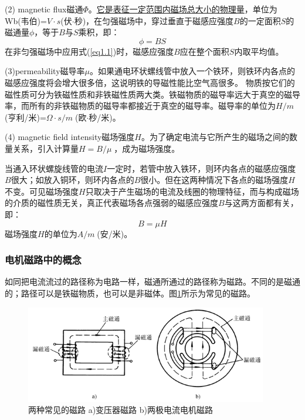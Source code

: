 \documentclass{book}
\begin{document}
(2) magnetic flux磁通$\Phi $。\uline{它是表征一定范围内磁场总大小的物理量}，单位为Wb(韦伯)=$V\cdot s$(伏$\cdot $秒)，在匀强磁场中，穿过垂直于磁感应强度$B$的一定面积$S$的磁通量$\phi $，等于$B$与$S$乘积，即：
\begin{equation}
\phi =BS
\label{eq1.1}
\end{equation}	
在非匀强磁场中应用式(\ref{eq1.1})时，磁感应强度$B$应在整个面积$S$内取平均值。

(3)permeability磁导率$\mu $。如果通电环状螺线管中放入一个铁环，则铁环内各点的磁感应强度将会增大很多倍，这说明铁的导磁性能比空气高很多。
物质按它们的磁性质可分为铁磁性质和非铁磁性质两大类。铁磁物质的磁导率远大于真空的磁导率，而所有的非铁磁物质的磁导率都接近于真空的磁导率。磁导率的单位为${H}/{m}\;$(亨利/米)=$\Omega \cdot {s}/{m}\;$(欧$\cdot $秒/米)。

(4) magnetic field intensity磁场强度$H$。为了确定电流与它所产生的磁场之间的数量关系，引入计算量$H={B}/{\mu }\;$，成为磁场强度。

当通入环状螺旋线管的电流$I$一定时，若管中放入铁环，则环内各点的磁感应强度$B$很大；如放入铜环，则环内各点的$B$很小。但在这两种情况下各点的磁场强度$H$不变。可见磁场强度$H$只取决于产生磁场的电流及线圈的物理特征，而与构成磁场的介质的磁性质无关，真正代表磁场各点强弱的磁感应强度$B$与这两方面都有关，即：
\begin{equation}
B=\mu H
\label{eq1.2}
\end{equation}
磁场强度$H$的单位为${A}/{m}\;$(安/米)。
\subsubsection{电机磁路中的概念}
如同把电流流过的路径称为电路一样，磁通所通过的路径称为磁路。不同的是磁通的；路径可以是铁磁物质，也可以是非磁体。图\ref{fig:changjiancilu}所示为常见的磁路。
\begin{figure}[H]
	\centering
	\includegraphics[width=25pc]{changjiancilu}
	\caption{两种常见的磁路 a)变压器磁路 b)两极电流电机磁路}
	\label{fig:changjiancilu}
\end{figure}
\end{document}
